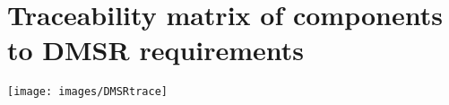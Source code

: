 \section{Traceability matrix of components to DMSR requirements \label{sec:trace}}

\texttt{[image: images/DMSRtrace]}
